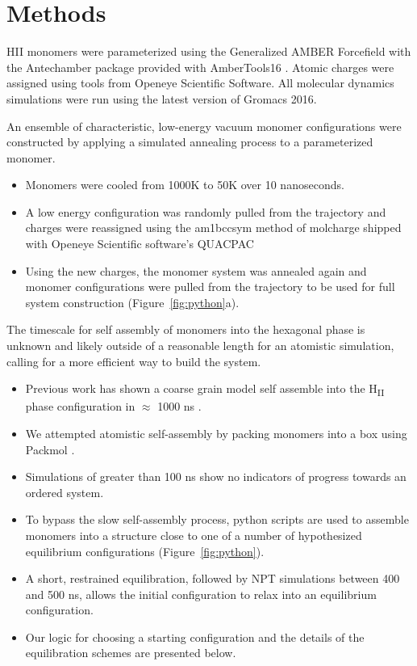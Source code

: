 \documentclass{article}
\begin{document}
  \section*{Methods}
  
  HII monomers were parameterized using the Generalized AMBER Forcefield
  \cite{wang_development_2004} with the Antechamber package \cite{wang_automatic_2006}
  provided with AmberTools16 \cite{case_ambertools16_2016}. Atomic charges were
  assigned using tools from Openeye Scientific Software. All molecular dynamics 
  simulations were run using the latest version of Gromacs 2016. 
  \cite{bekker_gromacs:_1993,berendsen_gromacs:_1995,van_der_spoel_gromacs:_2005,hess_gromacs_2008}
  
  An ensemble of characteristic, low-energy vacuum monomer configurations
  were constructed by applying a simulated annealing process to a
  parameterized monomer.
  \begin{itemize}
    \item Monomers were cooled from 1000K to 50K over 10 nanoseconds.
    \item A low energy configuration was randomly pulled from the trajectory
    and charges were reassigned using the am1bccsym method of molcharge
    shipped with Openeye Scientific software's QUACPAC %
    \item Using the new charges, the monomer system was annealed again and monomer
    configurations were pulled from the trajectory to be used for full
    system construction (Figure~\ref{fig:python}a).
  \end{itemize}
  
  The timescale for self assembly of monomers into the hexagonal phase is
  unknown and likely outside of a reasonable length for an atomistic
  simulation, calling for a more efficient way to build the system. 
  \begin{itemize}
    \item Previous work has shown a coarse grain model self assemble into
    the H\textsubscript{II} phase configuration in $\approx$ 1000 ns \cite{mondal_self-assembly_2013}.
    \item We attempted atomistic self-assembly by packing monomers into a box 
    using Packmol \cite{martinez_packmol:_2009}.
    \item Simulations of greater than 100 ns show no indicators of progress 
    towards an ordered system.
    \item To bypass the slow self-assembly process, python scripts are used
    to assemble monomers into a structure close 
    to one of a number of hypothesized equilibrium configurations (Figure~\ref{fig:python}).
    \item A short, restrained equilibration, followed by NPT simulations 
    between 400 and 500 ns, allows the initial configuration to relax into
    an equilibrium configuration.
    \item Our logic for choosing a starting configuration and the details 
    of the equilibration schemes are presented below.
  \end{itemize}
  
\end{document}
